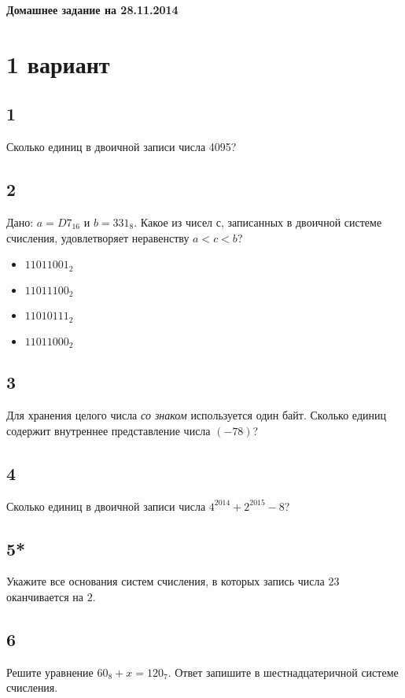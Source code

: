 \documentclass[a4paper,12pt]{article}
\begin{document}
\begin{center}
\Large{\textbf{Домашнее задание на 28.11.2014}}
\end{center}
\section*{1 вариант} 

\subsection*{1}
Сколько единиц в двоичной записи числа 4095? 

\subsection*{2}
Дано: $a = D7_{16}$ и $b = 331_8$. Какое из чисел с, записанных в двоичной системе счисления, удовлетворяет  неравенству $a < c < b$?
\begin{itemize}
 \item $11011001_2$
 \item $11011100_2$
 \item $11010111_2$
 \item $11011000_2$
\end{itemize}

\subsection*{3}
Для хранения целого числа \textit{со знаком} используется один байт. Сколько единиц содержит внутреннее представление числа $(-78)$? 

\subsection*{4}
Сколько единиц в двоичной записи числа  $4^{2014} + 2^{2015} - 8$?

\subsection*{5*}
Укажите все основания систем счисления, в которых запись числа $23$ оканчивается на $2$.

\subsection*{6}
Решите уравнение $60_8 + x  = 120_7$. Ответ запишите в шестнадцатеричной системе счисления.

\newpage
\end{document}

